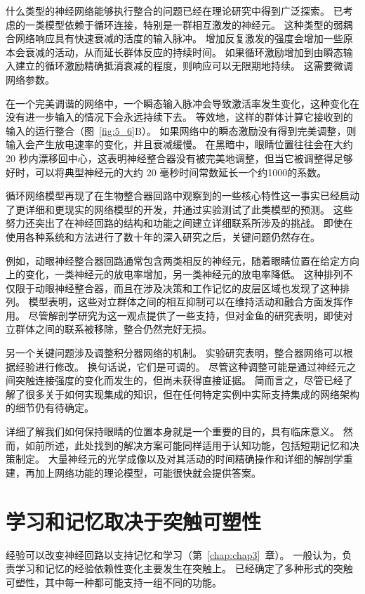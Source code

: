 什么类型的神经网络能够执行整合的问题已经在理论研究中得到广泛探索。 
已考虑的一类模型依赖于循环连接，特别是一群相互激发的神经元。 
这种类型的弱耦合网络响应具有快速衰减的活度的输入脉冲。
增加反复激发的强度会增加一些原本会衰减的活动，从而延长群体反应的持续时间。
如果循环激励增加到由瞬态输入建立的循环激励精确抵消衰减的程度，则响应可以无限期地持续。 这需要微调网络参数。


在一个完美调谐的网络中，一个瞬态输入脉冲会导致激活率发生变化，这种变化在没有进一步输入的情况下会永远持续下去。 
等效地，这样的群体计算它接收到的输入的运行整合（图~\ref{fig:5_6}B）。
如果网络中的瞬态激励没有得到完美调整，则输入会产生放电速率的变化，并且衰减缓慢。 
在黑暗中，眼睛位置往往会在大约 20 秒内漂移回中心，这表明神经整合器没有被完美地调整，但当它被调整得足够好时，可以将典型神经元的大约 20 毫秒时间常数延长一个约1000的系数。


循环网络模型再现了在生物整合器回路中观察到的一些核心特性这一事实已经启动了更详细和更现实的网络模型的开发，并通过实验测试了此类模型的预测。
这些努力还突出了在神经回路的结构和功能之间建立详细联系所涉及的挑战。
即使在使用各种系统和方法进行了数十年的深入研究之后，关键问题仍然存在。


例如，动眼神经整合器回路通常包含两类相反的神经元，随着眼睛位置在给定方向上的变化，一类神经元的放电率增加，另一类神经元的放电率降低。 
这种排列不仅限于动眼神经整合器，而且在涉及决策和工作记忆的皮层区域也发现了这种排列。
模型表明，这些对立群体之间的相互抑制可以在维持活动和融合方面发挥作用。 
尽管解剖学研究为这一观点提供了一些支持，但对金鱼的研究表明，即使对立群体之间的联系被移除，整合仍然完好无损。


另一个关键问题涉及调整积分器网络的机制。
实验研究表明，整合器网络可以根据经验进行修改。
换句话说，它们是可调的。 
尽管这种调整可能是通过神经元之间突触连接强度的变化而发生的，但尚未获得直接证据。 
简而言之，尽管已经了解了很多关于如何实现集成的知识，但在任何特定实例中实际支持集成的网络架构的细节仍有待确定。


详细了解我们如何保持眼睛的位置本身就是一个重要的目的，具有临床意义。 
然而，如前所述，此处找到的解决方案可能同样适用于认知功能，包括短期记忆和决策制定。
大量神经元的光学成像以及对其活动的时间精确操作和详细的解剖学重建，再加上网络功能的理论模型，可能很快就会提供答案。



\section{学习和记忆取决于突触可塑性}

经验可以改变神经回路以支持记忆和学习（第~\ref{chap:chap3}~章）。
一般认为，负责学习和记忆的经验依赖性变化主要发生在突触上。
已经确定了多种形式的突触可塑性，其中每一种都可能支持一组不同的功能。


